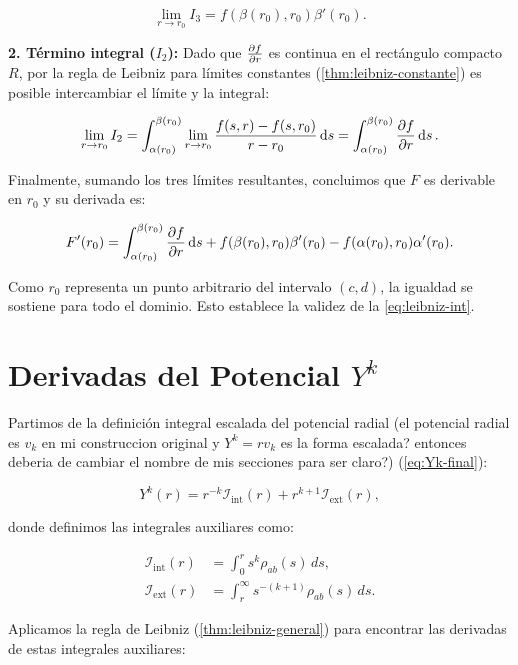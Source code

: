 \documentclass[12pt, a4paper, oneside, spanish]{book}
\makeatletter
\renewenvironment{proof}[1][\proofname]{\par
  \pushQED{\qed}
  \normalfont \topsep6\p@\@plus6\p@\relax
  \trivlist
  \item[\hskip\labelsep
        \bfseries\sffamily
        #1\@addpunct{.}]\ignorespaces
}{%
  \popQED\endtrivlist\@endpefalse
}
\makeatother
\begin{document}
\begin{proof}
  \[ \lim_{r\to r_0} I_3 = f(\beta(r_0),r_0)\beta'(r_0). \]

  \textbf{2. Término integral (\( I_2 \)):} Dado que \( \pdv{f}{r} \) es continua en el rectángulo compacto \( R \), por la regla de Leibniz para límites constantes (\cref{thm:leibniz-constante}) es posible intercambiar el límite y la integral:

  \[ \lim_{r \to r_0} I_2 = \int_{\alpha(r_0)}^{\beta(r_0)} \lim_{r\to r_0} \frac{f(s,r) - f(s,r_0)}{r-r_0} \dd{s} = \int_{\alpha(r_0)}^{\beta(r_0)} \pdv{f}{r}(s,r_0) \dd{s}. \]

  Finalmente, sumando los tres límites resultantes, concluimos que \( F \) es derivable en \( r_0 \) y su derivada es:

  \[ F'(r_0) = \int_{\alpha(r_0)}^{\beta(r_0)} \pdv{f}{r}(s,r_0) \dd{s} + f(\beta(r_0),r_0) \beta'(r_0) - f(\alpha(r_0), r_0) \alpha'(r_0). \]

  Como \( r_0 \) representa un punto arbitrario del intervalo \( (c,d) \), la igualdad se sostiene para todo el dominio. Esto establece la validez de la \cref{eq:leibniz-int}.

\end{proof}

\section{Derivadas del Potencial $Y^k$}

Partimos de la definición integral escalada del potencial radial (el potencial radial es \( v_k \) en mi construccion original y \( Y^k = rv_k \) es la forma escalada? entonces deberia de cambiar el nombre de mis secciones para ser claro?) (\cref{eq:Yk-final}):

\begin{equation}
    Y^k(r) = r^{-k} \mathcal{I}_{\text{int}}(r) + r^{k+1} \mathcal{I}_{\text{ext}}(r),
\end{equation}

donde definimos las integrales auxiliares como:

\begin{align}
    \mathcal{I}_{\text{int}}(r) &= \int_{0}^{r} s^k \rho_{ab}(s) \, ds, \\
    \mathcal{I}_{\text{ext}}(r) &= \int_{r}^{\infty} s^{-(k+1)} \rho_{ab}(s) \, ds.
\end{align}

Aplicamos la regla de Leibniz (\cref{thm:leibniz-general}) para encontrar las derivadas de estas integrales auxiliares:
\end{document}
